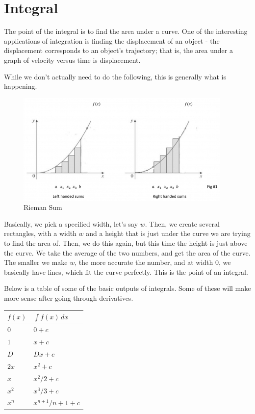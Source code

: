 \documentclass[12pt]{article}
\begin{document}
\section{Integral}

The point of the integral is to find the area under a curve. One of the interesting applications of integration is finding the displacement of an object - the displacement corresponds to an object's trajectory; that is, the area under a graph of velocity versus time is displacement.

While we don't actually need to do the following, this is generally what is happening. 

\begin{centering}
\begin{figure}[H]
\caption{Rieman Sum}
\includegraphics[scale=0.8]{rieman.jpg}
\end{figure}
\end{centering}

Basically, we pick a specified width, let's say $w$. Then, we create several rectangles, with a width $w$ and a height that is just under the curve we are trying to find the area of. Then, we do this again, but this time the height is just above the curve. We take the average of the two numbers, and get the area of the curve. The smaller we make $w$, the more accurate the number, and at width $0$, we basically have lines, which fit the curve perfectly. This is the point of an integral.

Below is a table of some of the basic outputs of integrals. Some of these will make more sense after going through derivatives.

\begin{tabular}{l|l}
    $f(x)$ & $\int f(x) \, dx$\\
    \hline
     $0$ & $0+c$ \\
     $1$ & $x+c$ \\
     $D$ & $Dx+c$ \\
     $2x$ & $x^2 + c$ \\
     $x$ & $x^2/2 + c$ \\
     $x^2$ & $x^3/3 + c$ \\
     $x^n$ & $x^{n+1}/n+1 + c$
\end{tabular}
\end{document}

